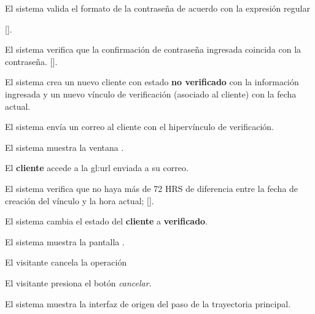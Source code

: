 {\begin{trayectoriaPrincipal}
    \item El sistema valida el formato de la contraseña de acuerdo con
      la expresión regular


      [].

    \item El sistema verifica que la confirmación de contraseña
      ingresada coincida con la contraseña.
      [].

    \item El sistema crea un nuevo cliente con estado
      \textbf{no verificado} con la información ingresada y un nuevo
      vínculo de verificación (asociado al cliente) con la fecha actual.

    \item El sistema envía un correo al cliente con el hipervínculo de
      verificación.

    \item El sistema muestra la ventana
      .

    \item El \textbf{cliente} accede a la \gls{gl:url} enviada a su
      correo.

    \item El sistema verifica que no haya más de 72 HRS de diferencia
      entre la fecha de creación del vínculo y la hora actual;
      [].

    \item El sistema cambia el estado del \textbf{cliente} a
      \textbf{verificado}.

    \item El sistema muestra la pantalla .

  \end{trayectoriaPrincipal}


  \begin{trayectoriaAlternativa}
    {El visitante cancela la operación}

    \item El visitante presiona el botón \textit{cancelar}.

    \item El sistema muestra la interfaz de origen del paso
       de la trayectoria principal.


\end{trayectoriaAlternativa}}
